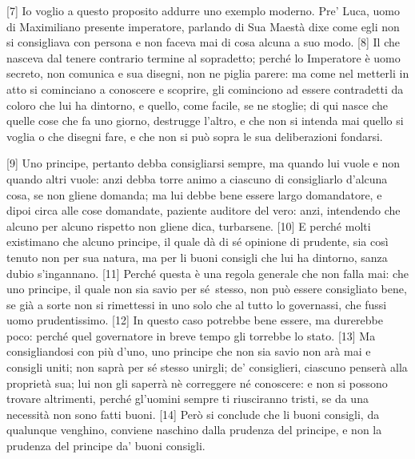 \pagebreak

{[}7{]} Io voglio a questo proposito addurre uno exemplo moderno. Pre'
Luca, uomo di Maximiliano presente imperatore, parlando di Sua Maestà
dixe come egli non si consigliava con persona e non faceva mai di cosa
alcuna a suo modo. {[}8{]} Il che nasceva dal tenere contrario termine
al sopradetto; perché lo Imperatore è uomo secreto, non comunica e sua
disegni, non ne piglia parere: ma come nel metterli in atto si
cominciano a conoscere e scoprire, gli cominciono ad essere contradetti
da coloro che lui ha dintorno, e quello, come facile, se ne stoglie; di
qui nasce che quelle cose che fa uno giorno, destrugge l'altro, e che
non si intenda mai quello si voglia o che disegni fare, e che non si può
sopra le sua deliberazioni fondarsi.

{[}9{]} Uno principe, pertanto debba consigliarsi sempre, ma quando lui
vuole e non quando altri vuole: anzi debba torre animo a ciascuno di
consigliarlo d'alcuna cosa, se non gliene domanda; ma lui debbe bene
essere largo domandatore, e dipoi circa alle cose domandate, paziente
auditore del vero: anzi, intendendo che alcuno per alcuno rispetto non
gliene dica, turbarsene. {[}10{]} E perché molti existimano che alcuno
principe, il quale dà di sé opinione di prudente, sia così tenuto non
per sua natura, ma per li buoni consigli che lui ha dintorno, sanza
dubio s'ingannano. {[}11{]} Perché questa è una regola generale che non
falla mai: che uno principe, il quale non sia savio per sé\est\ stesso, non
può essere consigliato bene, se già a sorte non si rimettessi in uno
solo che al tutto lo governassi, che fussi uomo prudentissimo. {[}12{]}
In questo caso potrebbe bene essere, ma durerebbe poco: perché quel
governatore in breve tempo gli torrebbe lo stato. {[}13{]} Ma
consigliandosi con più d'uno, uno principe che non sia savio non arà mai
e consigli uniti; non saprà per sé stesso unirgli; de' consiglieri,
ciascuno penserà alla proprietà sua; lui non gli saperrà nè correggere
né conoscere: e non si possono trovare altrimenti, perché gl'uomini
sempre ti riusciranno tristi, se da una necessità non sono fatti buoni.
{[}14{]} Però si conclude che li buoni consigli, da qualunque venghino, conviene naschino dalla prudenza del principe, e non la prudenza del principe da' buoni consigli.


